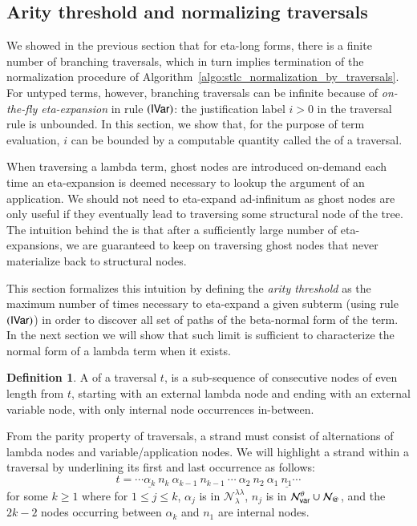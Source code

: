 \documentclass{elsarticle}
\makeatletter
\theoremstyle{plain}
\theoremstyle{definition}
\newtheorem{definition}{Definition}[section]
\theoremstyle{remark}
\newcommand\Nodes{\mathcal{N}}%
\newcommand\NodesVar{\Nodes_{\sf var}}%
\newcommand\NodesLmd{\Nodes_\lambda}%
\newcommand\NodesApp{\Nodes_@}%
\newcommand{\ghostlmd}{{\lambda\!\!\lambda}}
\newcommand{\ghostvar}{\theta}
\newcommand\ImNodesVar{\NodesVar^\ghostvar}
\newcommand\ImNodesLmd{\NodesLmd^\ghostlmd}
\makeatother
\begin{document}
\subsection{Arity threshold and normalizing traversals}

We showed in the previous section that for eta-long forms, there is a finite number of branching traversals, which in turn implies termination of the normalization procedure of Algorithm~\ref{algo:stlc_normalization_by_traversals}. For untyped terms, however, branching traversals can be infinite because of \emph{on-the-fly eta-expansion} in rule $\mathbf{({\sf IVar})}$: the justification label $i>0$ in the traversal rule is unbounded. In this section, we show that, for the purpose of term evaluation, $i$ can be bounded by a computable quantity called the  of a traversal.

When traversing a lambda term, ghost nodes are introduced on-demand each time an eta-expansion is deemed necessary to lookup the argument of an application.
We should not need to eta-expand ad-infinitum as ghost nodes are only useful if they eventually lead to traversing some structural node of the tree. The intuition behind the  is that after a sufficiently large number of eta-expansions, we are guaranteed to keep on traversing ghost nodes that never materialize back to structural nodes.

This section formalizes this intuition by defining the \emph{arity threshold} as the maximum number of times necessary to eta-expand a given subterm (using rule $\mathbf{({\sf IVar})}$)  in order to discover all set of paths of the beta-normal form of the term. In the next section we will show that such limit is sufficient to characterize the normal form of a lambda term when it exists.

\begin{definition}
\label{ref:strand}
A  of a traversal $t$, is a sub-sequence of consecutive nodes of even length from $t$, starting with an external lambda node and ending with an external variable node, with only internal node occurrences in-between.
\end{definition}

From the parity property of traversals, a strand must consist of alternations of lambda nodes and variable/application nodes. We will highlight a strand within a traversal by underlining its first and last occurrence as follows:
$$ t = \cdots \underline{\alpha_k}\ n_k\ \alpha_{k-1}\ n_{k-1}\ \cdots\ \alpha_2\ n_2\ \alpha_1\ \underline{n_1} \cdots $$
for some $k\geq 1$ where for $1 \leq j \leq k$, $\alpha_j$ is in $\ImNodesLmd$, $n_j$ is in $\ImNodesVar\union\NodesApp$, and the $2k-2$ nodes occurring between $\alpha_k$ and $n_1$ are internal nodes.
\end{document}
